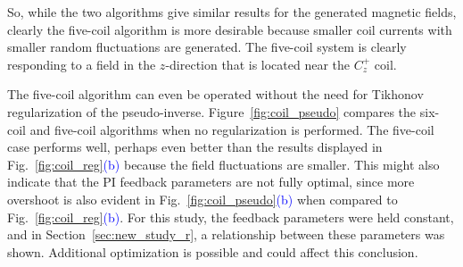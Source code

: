 So, while the two algorithms give similar results for the generated
magnetic fields, clearly the five-coil algorithm is more desirable
because smaller coil currents with smaller random fluctuations are
generated.  The five-coil system is clearly responding to a field in
the $z$-direction that is located near the $C_z^+$ coil.



The five-coil algorithm can even be operated without the need for
Tikhonov regularization of the pseudo-inverse.
Figure~\ref{fig:coil_pseudo} compares the six-coil and five-coil
algorithms when no regularization is performed.  The five-coil case
performs well, perhaps even better than the results displayed in
Fig.~\ref{fig:coil_reg}\textcolor{blue}{(b)} because the field
fluctuations are smaller.  This might also indicate that the PI
feedback parameters are not fully optimal, since more overshoot is
also evident in Fig.~\ref{fig:coil_pseudo}\textcolor{blue}{(b)} when
compared to Fig.~\ref{fig:coil_reg}\textcolor{blue}{(b)}.  For this
study, the feedback parameters were held constant, and in
Section~\ref{sec:new_study_r}, a relationship
between these parameters was shown.  Additional optimization is possible and
could affect this conclusion.


